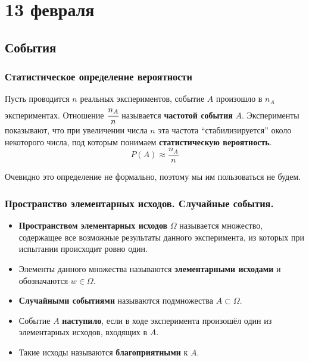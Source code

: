 \chapter{13 февраля}

\section{События}

\subsection{Статистическое определение вероятности}

\begin{definition}
    Пусть проводится \(n\) реальных экспериментов, событие \(A\) произошло в \(n_A\) экспериментах. Отношение \(\cfrac{n_A}{n}\) называется \textbf{частотой события} \(A\). Эксперименты показывают, что при увеличении числа \(n\) эта частота ``стабилизируется'' около некоторого числа, под которым понимаем \textbf{статистическую вероятность}.
    \[P(A)\approx \frac{n_A}{n}\]
\end{definition}

Очевидно это определение не формально, поэтому мы им пользоваться не будем.

\subsection{Пространство элементарных исходов. Случайные события.}

\begin{definition}\itemfix
    \begin{itemize}
        \item \textbf{Пространством элементарных исходов} \(\Omega\) называется множество, содержащее все возможные результаты данного эксперимента, из которых при испытании происходит ровно один.
        \item Элементы данного множества называются \textbf{элементарными исходами} и обозначаются \(w\in \Omega\).
        \item \textbf{Случайными событиями} называются подмножества \(A\subset \Omega\).
        \item Событие \(A\) \textbf{наступило}, если в ходе эксперимента произошёл один из элементарных исходов, входящих в \(A\).
        \item Такие исходы называются \textbf{благоприятными} к \(A\).
    \end{itemize}
\end{definition}

